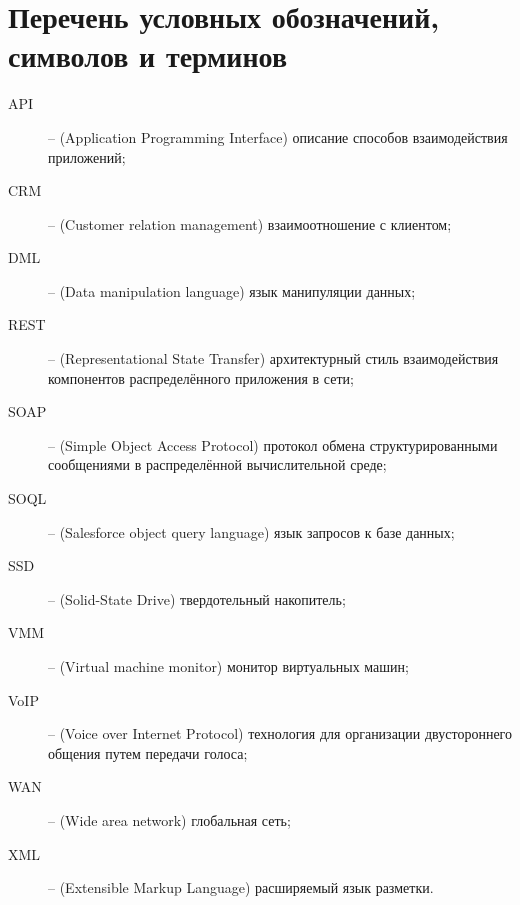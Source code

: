 \section*{Перечень условных обозначений, символов и терминов}




\begin{description}
	\item[\normalfont API] -- (Application Programming Interface) описание способов взаимодействия приложений;
	\item[\normalfont CRM] -- (Customer relation management) взаимоотношение с клиентом;
	\item[\normalfont DML] -- (Data manipulation language) язык манипуляции данных;
	\item[\normalfont REST] -- (Representational State Transfer) архитектурный стиль взаимодействия компонентов распределённого приложения в сети;
	\item[\normalfont SOAP] -- (Simple Object Access Protocol) протокол обмена структурированными сообщениями в распределённой вычислительной среде;
	\item[\normalfont SOQL] -- (Salesforce object query language) язык запросов к базе данных;
	\item[\normalfont SSD] -- (Solid-State Drive) твердотельный накопитель;
	\item[\normalfont VMM] -- (Virtual machine monitor) монитор виртуальных машин;
	\item[\normalfont VoIP] -- (Voice over Internet Protocol) технология для организации двустороннего общения путем передачи голоса;
	\item[\normalfont WAN] -- (Wide area network) глобальная сеть;
	\item[\normalfont XML] -- (Extensible Markup Language) расширяемый язык разметки.
\end{description}

\newpage
